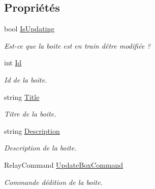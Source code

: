 \subsection*{Propriétés}
\begin{DoxyCompactItemize}
\item 
bool \hyperlink{class_boxes_1_1_view_models_1_1_edit_box_view_model_a748a7914cb47ab2734bdc748e23164e6}{Is\+Updating}
\begin{DoxyCompactList}\small\item\em Est-\/ce que la boite est en train d\textquotesingle{}être modifiée ? \end{DoxyCompactList}\item 
int \hyperlink{class_boxes_1_1_view_models_1_1_edit_box_view_model_a2fadb1f4b9f62da43e871d6164be76e2}{Id}
\begin{DoxyCompactList}\small\item\em Id de la boite. \end{DoxyCompactList}\item 
string \hyperlink{class_boxes_1_1_view_models_1_1_edit_box_view_model_af854468250ed81309d852290981bae5b}{Title}
\begin{DoxyCompactList}\small\item\em Titre de la boite. \end{DoxyCompactList}\item 
string \hyperlink{class_boxes_1_1_view_models_1_1_edit_box_view_model_a4639fb722a8e57e315ad69ad20906c4a}{Description}
\begin{DoxyCompactList}\small\item\em Description de la boite. \end{DoxyCompactList}\item 
Relay\+Command \hyperlink{class_boxes_1_1_view_models_1_1_edit_box_view_model_a564a5a2602c29685d7939e20e5dc1f81}{Update\+Box\+Command}
\begin{DoxyCompactList}\small\item\em Commande d\textquotesingle{}édition de la boite. \end{DoxyCompactList}\end{DoxyCompactItemize}
